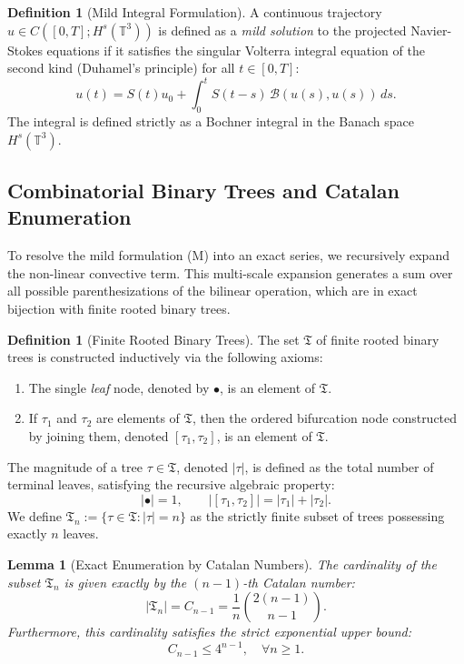 \documentclass[12pt,a4paper]{article}
\theoremstyle{plain}
\newtheorem{lemma}[theorem]{Lemma}
\theoremstyle{definition}
\newtheorem{definition}[theorem]{Definition}
\theoremstyle{remark}
\newcommand{\Hs}{H^s}
\newcommand{\T}{\mathbb{T}}
\newcommand{\BB}{\mathcal{B}}
\newcommand{\fT}{\mathfrak{T}}
\begin{document}
\begin{definition}[Mild Integral Formulation]
\label{def:mild}
A continuous trajectory $u \in C([0,T];\Hs(\T^3))$ is defined as a \emph{mild solution} to the projected Navier-Stokes equations if it satisfies the singular Volterra integral equation of the second kind (Duhamel's principle) for all $t \in [0,T]$:
\[
  u(t) = S(t)u_0 + \int_0^t S(t-s)\,\BB(u(s),u(s))\,ds.
  \tag{M}
\]
The integral is defined strictly as a Bochner integral in the Banach space $\Hs(\T^3)$.
\end{definition}


\subsection{Combinatorial Binary Trees and Catalan Enumeration}
\label{subsec:trees}

To resolve the mild formulation (M) into an exact series, we recursively expand the non-linear convective term. This multi-scale expansion generates a sum over all possible parenthesizations of the bilinear operation, which are in exact bijection with finite rooted binary trees.

\begin{definition}[Finite Rooted Binary Trees]
\label{def:arbres}
The set $\fT$ of finite rooted binary trees is constructed inductively via the following axioms:
\begin{enumerate}[label=(\roman*)]
  \item The single \emph{leaf} node, denoted by $\bullet$, is an element of $\fT$.
  \item If $\tau_1$ and $\tau_2$ are elements of $\fT$, then the ordered bifurcation node constructed by joining them, denoted $[\tau_1,\tau_2]$, is an element of $\fT$.
\end{enumerate}
The magnitude of a tree $\tau \in \fT$, denoted $|\tau|$, is defined as the total number of terminal leaves, satisfying the recursive algebraic property:
\[
  |\bullet| = 1, \qquad |[\tau_1,\tau_2]| = |\tau_1| + |\tau_2|.
\]
We define $\fT_n := \{\tau\in\fT : |\tau|=n\}$ as the strictly finite subset of trees possessing exactly $n$ leaves.
\end{definition}

\begin{lemma}[Exact Enumeration by Catalan Numbers]
\label{lem:catalan}
The cardinality of the subset $\fT_n$ is given exactly by the $(n-1)$-th Catalan number:
\[
  |\fT_n| = C_{n-1} = \frac{1}{n}\binom{2(n-1)}{n-1}.
\]
Furthermore, this cardinality satisfies the strict exponential upper bound:
\[
  C_{n-1} \le 4^{n-1}, \quad \forall n \ge 1.
\]
\end{lemma}
\end{document}

